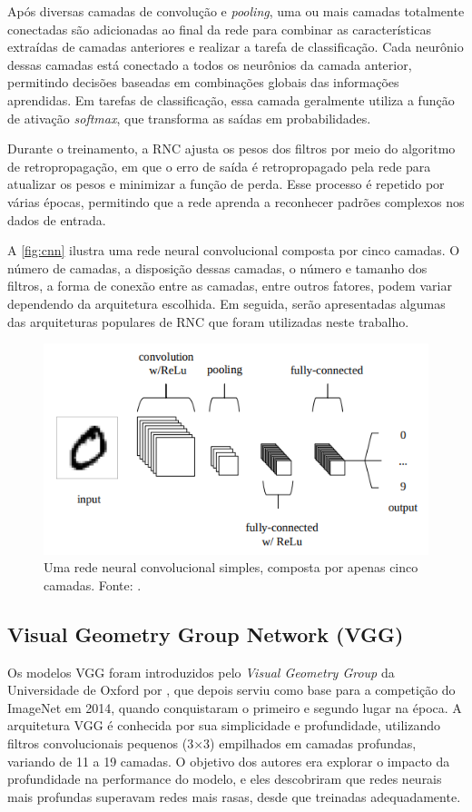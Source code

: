 Após diversas camadas de convolução e \textit{pooling}, uma ou mais camadas totalmente conectadas são adicionadas ao final da rede para combinar as características extraídas de camadas anteriores e realizar a tarefa de classificação. Cada neurônio dessas camadas está conectado a todos os neurônios da camada anterior, permitindo decisões baseadas em combinações globais das informações aprendidas. Em tarefas de classificação, essa camada geralmente utiliza a função de ativação \textit{softmax}, que transforma as saídas em probabilidades.

Durante o treinamento, a RNC ajusta os pesos dos filtros por meio do algoritmo de retropropagação, em que o erro de saída é retropropagado pela rede para atualizar os pesos e minimizar a função de perda. Esse processo é repetido por várias épocas, permitindo que a rede aprenda a reconhecer padrões complexos nos dados de entrada.

A \autoref{fig:cnn} ilustra uma rede neural convolucional composta por cinco camadas. O número de camadas, a disposição dessas camadas, o número e tamanho dos filtros, a forma de conexão entre as camadas, entre outros fatores, podem variar dependendo da arquitetura escolhida. Em seguida, serão apresentadas algumas das arquiteturas populares de RNC que foram utilizadas neste trabalho.

\begin{figure}[!htbp]
    \centering
    \includegraphics[width=0.7\linewidth]{figs/convolution-neural-network.png}
    \caption{Uma rede neural convolucional simples, composta por apenas cinco camadas. Fonte: .}
    \label{fig:cnn}
\end{figure}

\subsection{Visual Geometry Group Network (VGG)}

Os modelos VGG foram introduzidos pelo \textit{Visual Geometry Group} da Universidade de Oxford por , que depois serviu como base para a competição do ImageNet em 2014, quando conquistaram o primeiro e segundo lugar na época. A arquitetura VGG é conhecida por sua simplicidade e profundidade, utilizando filtros convolucionais pequenos (3×3) empilhados em camadas profundas, variando de 11 a 19 camadas. O objetivo dos autores era explorar o impacto da profundidade na performance do modelo, e eles descobriram que redes neurais mais profundas superavam redes mais rasas, desde que treinadas adequadamente.

